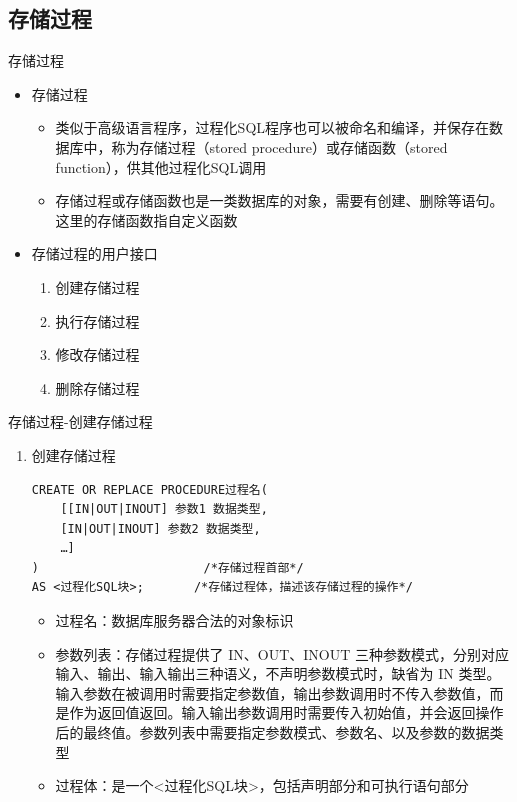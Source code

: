 \subsection{存储过程}
\begin{frame}{存储过程}
\begin{itemize}
    \item 存储过程
    \begin{itemize}
        \item 类似于高级语言程序，过程化SQL程序也可以被命名和编译，并保存在数据库中，称为存储过程（stored procedure）或存储函数（stored function），供其他过程化SQL调用
        \item 存储过程或存储函数也是一类数据库的对象，需要有创建、删除等语句。这里的存储函数指自定义函数
    \end{itemize}
    \item 存储过程的用户接口
    \begin{enumerate}
        \item 创建存储过程
        \item 执行存储过程 
        \item 修改存储过程
        \item 删除存储过程 
    \end{enumerate}
\end{itemize}
\end{frame}

\begin{frame}{存储过程-创建存储过程}
\begin{enumerate}
    \item 创建存储过程
\begin{block}{}
\begin{lstlisting}[linewidth=\textwidth]
CREATE OR REPLACE PROCEDURE过程名(
    [[IN|OUT|INOUT] 参数1 数据类型,
    [IN|OUT|INOUT] 参数2 数据类型,
    …]
)                       /*存储过程首部*/ 
AS <过程化SQL块>;       /*存储过程体，描述该存储过程的操作*/
\end{lstlisting}
\end{block} 
\begin{itemize}
    \item 过程名：数据库服务器合法的对象标识
    \item 参数列表：存储过程提供了 IN、OUT、INOUT 三种参数模式，分别对应输入、输出、输入输出三种语义，不声明参数模式时，缺省为 IN 类型。输入参数在被调用时需要指定参数值，输出参数调用时不传入参数值，而是作为返回值返回。输入输出参数调用时需要传入初始值，并会返回操作后的最终值。参数列表中需要指定参数模式、参数名、以及参数的数据类型
    \item 过程体：是一个<过程化SQL块>，包括声明部分和可执行语句部分 
\end{itemize}
\end{enumerate}
\framebreak
\end{frame}

